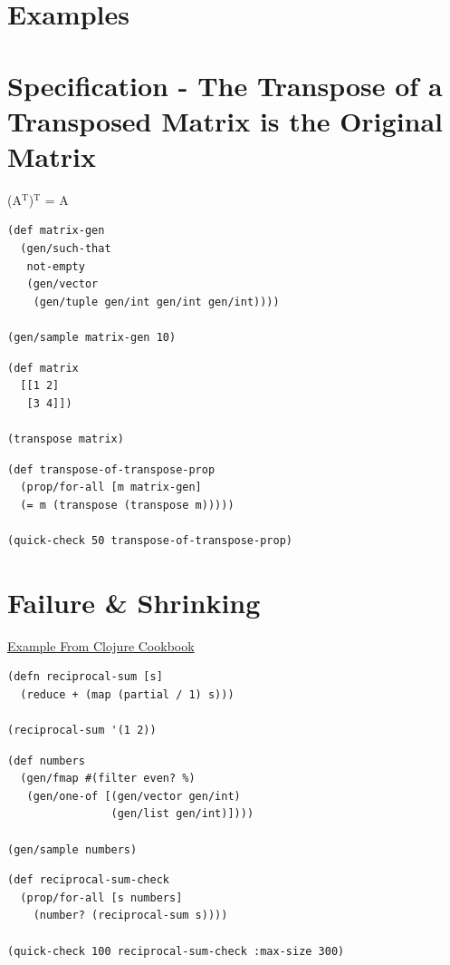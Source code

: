 \documentclass[11pt]{article}
\begin{document}
\section{Examples}
\label{sec-20}
\section{Specification - The Transpose of a Transposed Matrix is the Original Matrix}
\label{sec-21}

(A\(^{\text{T}}\))\(^{\text{T}}\) = A

\begin{verbatim}
(def matrix-gen
  (gen/such-that
   not-empty
   (gen/vector
    (gen/tuple gen/int gen/int gen/int))))

(gen/sample matrix-gen 10)
\end{verbatim}

\begin{verbatim}
(def matrix
  [[1 2]
   [3 4]])

(transpose matrix)
\end{verbatim}

\begin{verbatim}
(def transpose-of-transpose-prop
  (prop/for-all [m matrix-gen]
  (= m (transpose (transpose m)))))

(quick-check 50 transpose-of-transpose-prop)
\end{verbatim}

\section{Failure \& Shrinking}
\label{sec-22}

\href{http://bit.ly/1kmjKFY}{Example From Clojure Cookbook}

\begin{verbatim}
(defn reciprocal-sum [s]
  (reduce + (map (partial / 1) s)))

(reciprocal-sum '(1 2))
\end{verbatim}

\begin{verbatim}
(def numbers
  (gen/fmap #(filter even? %)
   (gen/one-of [(gen/vector gen/int)
                (gen/list gen/int)])))

(gen/sample numbers)
\end{verbatim}

\begin{verbatim}
(def reciprocal-sum-check
  (prop/for-all [s numbers]
    (number? (reciprocal-sum s))))

(quick-check 100 reciprocal-sum-check :max-size 300)
\end{verbatim}
\end{document}
